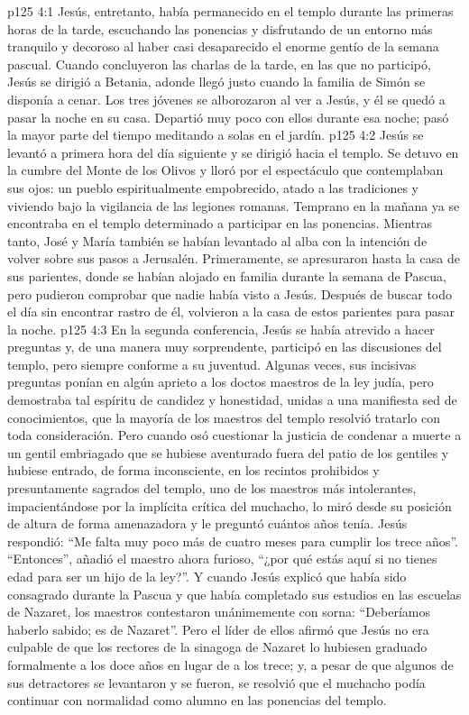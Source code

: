 \vs p125 4:1 Jesús, entretanto, había permanecido en el templo durante las primeras horas de la tarde, escuchando las ponencias y disfrutando de un entorno más tranquilo y decoroso al haber casi desaparecido el enorme gentío de la semana pascual. Cuando concluyeron las charlas de la tarde, en las que no participó, Jesús se dirigió a Betania, adonde llegó justo cuando la familia de Simón se disponía a cenar. Los tres jóvenes se alborozaron al ver a Jesús, y él se quedó a pasar la noche en su casa. Departió muy poco con ellos durante esa noche; pasó la mayor parte del tiempo meditando a solas en el jardín.
\vs p125 4:2 Jesús se levantó a primera hora del día siguiente y se dirigió hacia el templo. Se detuvo en la cumbre del Monte de los Olivos y lloró por el espectáculo que contemplaban sus ojos: un pueblo espiritualmente empobrecido, atado a las tradiciones y viviendo bajo la vigilancia de las legiones romanas. Temprano en la mañana ya se encontraba en el templo determinado a participar en las ponencias. Mientras tanto, José y María también se habían levantado al alba con la intención de volver sobre sus pasos a Jerusalén. Primeramente, se apresuraron hasta la casa de sus parientes, donde se habían alojado en familia durante la semana de Pascua, pero pudieron comprobar que nadie había visto a Jesús. Después de buscar todo el día sin encontrar rastro de él, volvieron a la casa de estos parientes para pasar la noche.
\vs p125 4:3 En la segunda conferencia, Jesús se había atrevido a hacer preguntas y, de una manera muy sorprendente, participó en las discusiones del templo, pero siempre conforme a su juventud. Algunas veces, sus incisivas preguntas ponían en algún aprieto a los doctos maestros de la ley judía, pero demostraba tal espíritu de candidez y honestidad, unidas a una manifiesta sed de conocimientos, que la mayoría de los maestros del templo resolvió tratarlo con toda consideración. Pero cuando osó cuestionar la justicia de condenar a muerte a un gentil embriagado que se hubiese aventurado fuera del patio de los gentiles y hubiese entrado, de forma inconsciente, en los recintos prohibidos y presuntamente sagrados del templo, uno de los maestros más intolerantes, impacientándose por la implícita crítica del muchacho, lo miró desde su posición de altura de forma amenazadora y le preguntó cuántos años tenía. Jesús respondió: “Me falta muy poco más de cuatro meses para cumplir los trece años”. “Entonces”, añadió el maestro ahora furioso, “¿por qué estás aquí si no tienes edad para ser un hijo de la ley?”. Y cuando Jesús explicó que había sido consagrado durante la Pascua y que había completado sus estudios en las escuelas de Nazaret, los maestros contestaron unánimemente con sorna: “Deberíamos haberlo sabido; es de Nazaret”. Pero el líder de ellos afirmó que Jesús no era culpable de que los rectores de la sinagoga de Nazaret lo hubiesen graduado formalmente a los doce años en lugar de a los trece; y, a pesar de que algunos de sus detractores se levantaron y se fueron, se resolvió que el muchacho podía continuar con normalidad como alumno en las ponencias del templo.

